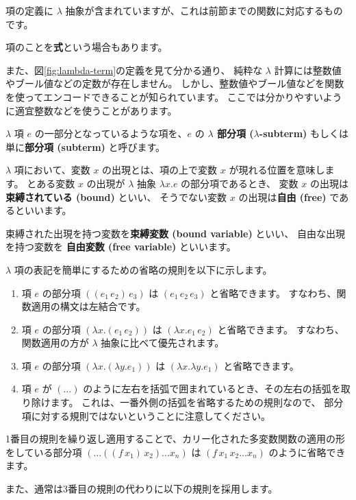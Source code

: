 項の定義に $\lambda$ 抽象が含まれていますが、これは前節までの関数に対応するものです。

項のことを\textbf{式}という場合もあります。

また、図\ref{fig:lambda-term}の定義を見て分かる通り、
純粋な $\lambda$ 計算には整数値やブール値などの定数が存在しません。
しかし、整数値やブール値などを関数を使ってエンコードできることが知られています。
ここでは分かりやすいように適宜整数などを使うことがあります。

$\lambda$ 項 $e$ の一部分となっているような項を、$e$ の
\textbf{$\lambda$ 部分項 ($\lambda$-subterm)} もしくは単に\textbf{部分項 (subterm)} と呼びます。

$\lambda$ 項において、変数 $x$ の出現とは、項の上で変数 $x$ が現れる位置を意味します。
とある変数 $x$ の出現が $\lambda$ 抽象 $\lambda x . e$ の部分項であるとき、
変数 $x$ の出現は\textbf{束縛されている (bound)} といい、
そうでない変数 $x$ の出現は\textbf{自由 (free)} であるといいます。

束縛された出現を持つ変数を\textbf{束縛変数 (bound variable)} といい、
自由な出現を持つ変数を \textbf{自由変数 (free variable)} といいます。

$\lambda$ 項の表記を簡単にするための省略の規則を以下に示します。

\begin{enumerate}
  \item 項 $e$ の部分項 $((e_1 \, e_2) \, e_3)$ は $(e_1 \, e_2 \, e_3)$ と省略できます。
        すなわち、関数適用の構文は左結合です。
  \item 項 $e$ の部分項 $(\lambda x. (e_1 \, e_2))$ は $(\lambda x. e_1 \, e_2)$ と省略できます。
        すなわち、関数適用の方が $\lambda$ 抽象に比べて優先されます。
  \item 項 $e$ の部分項 $(\lambda x . (\lambda y . e_1))$ は $(\lambda x . \lambda y . e_1)$
        と省略できます。
  \item 項 $e$ が $(\dots)$ のように左右を括弧で囲まれているとき、その左右の括弧を取り除けます。
        これは、一番外側の括弧を省略するための規則なので、
        部分項に対する規則ではないということに注意してください。
\end{enumerate}

1番目の規則を繰り返し適用することで、カリー化された多変数関数の適用の形をしている部分項
$(\dots((f \, x_1) \, x_2) \dots x_n)$ は $(f \, x_1 \, x_2 \dots x_n)$ のように省略できます。

また、通常は3番目の規則の代わりに以下の規則を採用します。

